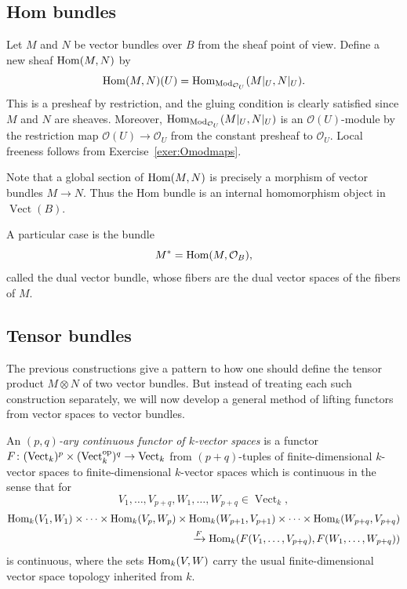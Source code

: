 \documentclass[a4paper,openany]{scrbook}
\DeclareMathOperator{\Vect}{Vect}
\begin{document}
\subsection{Hom bundles}

Let $M$ and $N$ be vector bundles over $B$ from the sheaf point of view. Define a new sheaf $\operatorname{Hom}(M,N)$ by
\[
\operatorname{Hom}(M,N)(U) = \operatorname{Hom}_{\operatorname{Mod}_{\mathcal O_U}}(M|_U,N|_U).
\]
This is a presheaf by restriction, and the gluing condition is clearly satisfied since $M$ and $N$ are sheaves. Moreover, $\operatorname{Hom}_{\operatorname{Mod}_{\mathcal O_U}}(M|_U,N|_U)$ is an $\mathcal O(U)$-module by the restriction map $\mathcal O(U) \to \mathcal O_U$ from the constant presheaf to $\mathcal O_U$. Local freeness follows from Exercise~\ref{exer:Omodmaps}.

Note that a global section of $\operatorname{Hom}(M,N)$ is precisely a morphism of vector bundles $M \to N$. Thus the Hom bundle is an internal homomorphism object in $\Vect(B)$.

A particular case is the bundle
\[
M^* = \operatorname{Hom}(M,\mathcal O_B),
\]
called the dual vector bundle, whose fibers are the dual vector spaces of the fibers of $M$.

\subsection{Tensor bundles}

The previous constructions give a pattern to how one should define the tensor product $M \otimes N$ of two vector bundles. But instead of treating each such construction separately, we will now develop a general method of lifting functors from vector spaces to vector bundles.

\begin{defn}
An \emph{$(p,q)$-ary continuous functor of $k$-vector spaces} is a functor $F\colon (\Vect_k)^p \times (\Vect_k^\op)^q \to \Vect_k$ from $(p+q)$-tuples of finite-dimensional $k$-vector spaces to finite-dimensional $k$-vector spaces which is continuous in the sense that for
\[
V_1,\dots,V_{p+q}, W_1,\dots,W_{p+q} \in \Vect_k,
\]
\begin{align*}
\operatorname{Hom}_k(V_1,W_1) \times \cdots \times \operatorname{Hom}_k(V_{p},W_{p}) \times \operatorname{Hom}_k(W_{p+1},V_{p+1}) \times \cdots \times \operatorname{Hom}_k(W_{p+q},V_{p+q}) \\
\xrightarrow{F} \operatorname{Hom}_k(F(V_1,\dots,V_{p+q}),F(W_1,\dots,W_{p+q}))
\end{align*}
is continuous, where the sets $\operatorname{Hom}_k(V,W)$ carry the usual finite-dimensional vector space topology inherited from $k$.
\end{defn} 
\end{document}
